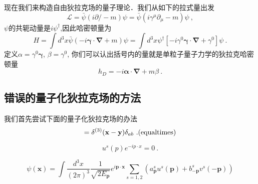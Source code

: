 
现在我们来构造自由狄拉克场的量子理论．我们从如下的拉式量出发
\begin{equation}
\mathcal L = \bar \psi (i \partial\!\!\!/ - m)\psi = \bar \psi (i \gamma^\mu \partial_\mu - m)\psi~,
\end{equation}
$\psi$的共轭动量是$i\psi^\dagger$,因此哈密顿量为
\begin{equation}
H = \int d^3 x \bar \psi (-i \boldsymbol \gamma \cdot \boldsymbol \nabla + m)\psi = \int d^3 x \psi^\dagger [-i\gamma^0\boldsymbol\gamma \cdot \boldsymbol\nabla + \gamma^0]\psi ~.
\end{equation}
定义$\alpha = \gamma^0 \boldsymbol\gamma$, $\beta = \gamma^0$, 你们可以认出括号内的量就是单粒子量子力学的狄拉克哈密顿量
\begin{equation}
h_D = - i \boldsymbol\alpha \cdot \boldsymbol \nabla + m \beta ~.
\end{equation} 

\subsection{错误的量子化狄拉克场的方法}
我们首先尝试下面的量子化狄拉克场的办法
\begin{equation}
[\psi_a(\mathbf x),\psi_b^\dagger(\mathbf y)] = \delta^{(3)}(\mathbf x - \mathbf y)\delta_{ab}~. {\rm (equal times)}
\end{equation}

\begin{equation}
[i\gamma^0\partial_0+i\boldsymbol \gamma \cdot \nabla - m ] u^s (p) e^{-ip\cdot x} = 0~.
\end{equation}

\begin{equation}
\psi(\mathbf x)= \int \frac{d^3 x}{(2\pi)^3} \frac{1}{\sqrt{2 E_{\mathbf p}}} e^{i \mathbf p \cdot \mathbf x} \sum_{s = 1,2} (a_{\mathbf p}^s u^s(\mathbf p)+ b_{-\mathbf p}^s v^s(-\mathbf p))
\end{equation}
